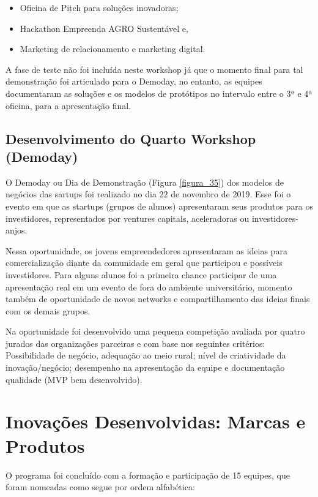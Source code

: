  \begin{itemize}
   \item Oficina de Pitch para soluções inovadoras;
   \item Hackathon Empreenda AGRO Sustentável e,
   \item Marketing de relacionamento e marketing digital.
 \end{itemize}

A fase de teste não foi incluída neste workshop já que o momento final para tal demonstração foi articulado para o Demoday, no entanto, as equipes documentaram as soluções e os modelos de protótipos no intervalo entre o 3ª e 4ª oficina, para a apresentação final.

\subsection{Desenvolvimento do Quarto Workshop (Demoday)}


O Demoday ou Dia de Demonstração (Figura \ref{figura_35}) dos modelos de negócios das sartups foi realizado no dia 22 de novembro de 2019. Esse foi o evento em que as startups (grupos de alunos) apresentaram seus produtos para os investidores, representados por ventures capitals, aceleradoras ou investidores-anjos.

Nessa oportunidade, os jovens empreendedores apresentaram as ideias para comercialização diante da comunidade em geral que participou e possíveis investidores. Para alguns alunos foi a primeira chance participar de uma apresentação real em um evento de fora do ambiente universitário, momento também de oportunidade de novos networks e compartilhamento das ideias finais com os demais grupos.

Na oportunidade foi desenvolvido uma pequena competição avaliada por quatro jurados das organizações parceiras e com base nos seguintes critérios: Possibilidade de negócio, adequação ao meio rural; nível de criatividade da inovação/negócio; desempenho na apresentação da equipe e documentação qualidade (MVP bem desenvolvido). 


\section{Inovações Desenvolvidas: Marcas e Produtos}
\label{inovacoes}

O programa foi concluído  com a formação e participação de 15 equipes, que foram nomeadas como segue por ordem alfabética: 

